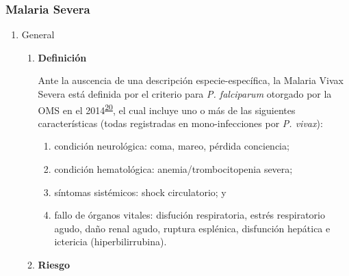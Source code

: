 \documentclass[]{article}
\providecommand{\tightlist}{%
  \setlength{\itemsep}{0pt}\setlength{\parskip}{0pt}}
\begin{document}
\subsubsection{Malaria Severa}\label{malaria-severa}

\begin{enumerate}
\def\labelenumi{\alph{enumi}.}
\item
  General

  \begin{enumerate}
  \def\labelenumii{\roman{enumii}.}
  \item
    \textbf{Definición}

    Ante la auscencia de una descripción especie-específica, la Malaria
    Vivax Severa está definida por el criterio para \emph{P. falciparum}
    otorgado por la OMS en el
    2014\textsuperscript{\protect\hyperlink{ref-WHO2014severe}{20}}, el
    cual incluye uno o más de las siguientes características (todas
    registradas en mono-infecciones por \emph{P. vivax}):

    \begin{enumerate}
    \def\labelenumiii{\arabic{enumiii}.}
    \tightlist
    \item
      condición neurológica: coma, mareo, pérdida conciencia;
    \item
      condición hematológica: anemia/trombocitopenia severa;
    \item
      síntomas sistémicos: shock circulatorio; y
    \item
      fallo de órganos vitales: disfución respiratoria, estrés
      respiratorio agudo, daño renal agudo, ruptura esplénica,
      disfunción hepática e ictericia (hiperbilirrubina).
    \end{enumerate}
  \item
    \textbf{Riesgo}


\end{enumerate}
\end{enumerate}
\end{document}
